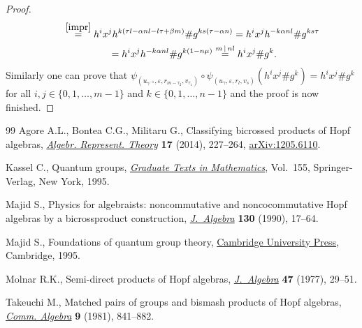 \documentclass[11pt]{article}
\numberwithin{equation}{section}
\begin{document}
\begin{proof}
\begin{gather*}
\qquad{} \stackrel{\eqref{impr}} {=} h^{i}x^{j} h^{k(\tau l - \alpha n l - l \tau + \beta m)} \# g^{ks(\tau - \alpha n)}
 = h^{i}x^{j} h^{-k \alpha n l } \# g^{ks\tau} \\
 \qquad \ {} = h^{i}x^{j} h^{-k \alpha n l } \# g^{k(1-n \mu)} \stackrel{m \,|\, nl} = h^{i}x^{j} \# g^{k}.
\end{gather*}
Similarly one can prove that $\psi_{(u_{\gamma^{-1}}, \varepsilon, r_{m-\tau_{2}}, v_{\tau_{1}})} \circ \psi_{(u_{\gamma}, \varepsilon, r_{l}, v_{s})} (h^{i}x^{j} \# g^{k}) = h^{i}x^{j} \# g^{k}$ for all $i, j \in \{0, 1,\dots, m-1\}$ and $k \in \{0, 1,\dots, n-1\}$ and the proof is now finished.
\end{proof}
\begin{thebibliography}{99}
Agore A.L., Bontea C.G., Militaru G., Classifying bicrossed products of {H}opf
 algebras, \href{https://doi.org/10.1007/s10468-012-9396-5}{\textit{Algebr. Represent. Theory}} \textbf{17} (2014), 227--264,
 \href{https://arxiv.org/abs/1205.6110}{arXiv:1205.6110}.

Kassel C., Quantum groups, \href{https://doi.org/10.1007/978-1-4612-0783-2}{\textit{Graduate Texts in Mathematics}}, Vol.~155,
 Springer-Verlag, New York, 1995.

Majid S., Physics for algebraists: noncommutative and noncocommutative {H}opf
 algebras by a bicrossproduct construction, \href{https://doi.org/10.1016/0021-8693(90)90099-A}{\textit{J.~Algebra}} \textbf{130}
 (1990), 17--64.

Majid S., Foundations of quantum group theory, \href{https://doi.org/10.1017/CBO9780511613104}{Cambridge University Press},
 Cambridge, 1995.

Molnar R.K., Semi-direct products of {H}opf algebras, \href{https://doi.org/10.1016/0021-8693(77)90208-3}{\textit{J.~Algebra}}
 \textbf{47} (1977), 29--51.

Takeuchi M., Matched pairs of groups and bismash products of {H}opf algebras,
 \href{https://doi.org/10.1080/00927878108822621}{\textit{Comm. Algebra}} \textbf{9} (1981), 841--882.

\end{thebibliography}
\end{document}
